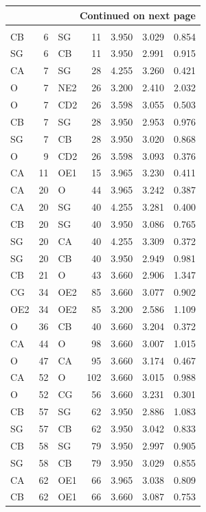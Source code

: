\documentclass[11pt,twoside,letterpaper]{article}
\begin{document}
\begin{center}
\begin{longtable}{lr>{\hspace{1cm}}lr>{\hspace{1cm}}r>{\hspace{1cm}}r>{\hspace{1cm}}r}
	\bottomrule
	\multicolumn{7}{r}{{Continued on next page}}\\
	\bottomrule
	\endfoot
	\bottomrule
	\multicolumn{7}{r}{{End of \tablename\ \thetable{}}}\\
	\bottomrule
	\endlastfoot
		CB & 6 & SG & 11 & 3.950 & 3.029 & 0.854\\
		SG & 6 & CB & 11 & 3.950 & 2.991 & 0.915\\
		CA & 7 & SG & 28 & 4.255 & 3.260 & 0.421\\
		O & 7 & NE2 & 26 & 3.200 & 2.410 & 2.032\\
		O & 7 & CD2 & 26 & 3.598 & 3.055 & 0.503\\
		CB & 7 & SG & 28 & 3.950 & 2.953 & 0.976\\
		SG & 7 & CB & 28 & 3.950 & 3.020 & 0.868\\
		O & 9 & CD2 & 26 & 3.598 & 3.093 & 0.376\\
		CA & 11 & OE1 & 15 & 3.965 & 3.230 & 0.411\\
		CA & 20 & O & 44 & 3.965 & 3.242 & 0.387\\
		CA & 20 & SG & 40 & 4.255 & 3.281 & 0.400\\
		CB & 20 & SG & 40 & 3.950 & 3.086 & 0.765\\
		SG & 20 & CA & 40 & 4.255 & 3.309 & 0.372\\
		SG & 20 & CB & 40 & 3.950 & 2.949 & 0.981\\
		CB & 21 & O & 43 & 3.660 & 2.906 & 1.347\\
		CG & 34 & OE2 & 85 & 3.660 & 3.077 & 0.902\\
		OE2 & 34 & OE2 & 85 & 3.200 & 2.586 & 1.109\\
		O & 36 & CB & 40 & 3.660 & 3.204 & 0.372\\
		CA & 44 & O & 98 & 3.660 & 3.007 & 1.015\\
		O & 47 & CA & 95 & 3.660 & 3.174 & 0.467\\
		CA & 52 & O & 102 & 3.660 & 3.015 & 0.988\\
		O & 52 & CG & 56 & 3.660 & 3.231 & 0.301\\
		CB & 57 & SG & 62 & 3.950 & 2.886 & 1.083\\
		SG & 57 & CB & 62 & 3.950 & 3.042 & 0.833\\
		CB & 58 & SG & 79 & 3.950 & 2.997 & 0.905\\
		SG & 58 & CB & 79 & 3.950 & 3.029 & 0.855\\
		CA & 62 & OE1 & 66 & 3.965 & 3.038 & 0.809\\
		CB & 62 & OE1 & 66 & 3.660 & 3.087 & 0.753\\

\end{longtable}
\end{center}
\end{document}

